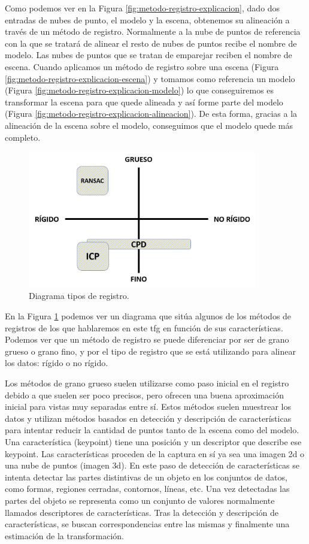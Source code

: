 Como podemos ver en la Figura \ref{fig:metodo-registro-explicacion}, dado dos entradas de nubes de punto, el modelo y la escena, obtenemos su alineación a través de un método de registro.
Normalmente a la nube de puntos de referencia con la que se tratará de alinear el resto de nubes de puntos recibe el nombre de modelo.
Las nubes de puntos que se tratan de emparejar reciben el nombre de escena.
Cuando aplicamos un método de registro sobre una escena (Figura \ref{fig:metodo-registro-explicacion-escena}) y tomamos como referencia un modelo (Figura \ref{fig:metodo-registro-explicacion-modelo}) lo que conseguiremos es transformar la escena para que quede alineada y así forme parte del modelo (Figura \ref{fig:metodo-registro-explicacion-alineacion}).
De esta forma, gracias a la alineación de la escena sobre el modelo, conseguimos que el modelo quede más completo.

\begin{figure}[h]
    \centering
    \includegraphics[height=6cm]{archivos/diagrama-tipos-registro.png}
    \caption{Diagrama tipos de registro.}
    \label{fig:diagrama-tipos-registro}
\end{figure}

En la Figura \ref{fig:diagrama-tipos-registro} podemos ver un diagrama que sitúa algunos de los métodos de registros de los que hablaremos en este \gls{tfg} en función de sus características.
Podemos ver que un método de registro se puede diferenciar por ser de grano grueso o grano fino, y por el tipo de registro que se está utilizando para alinear los datos: rígido o no rígido.
    
Los métodos de grano grueso suelen utilizarse como paso inicial en el registro debido a que suelen ser poco precisos, pero ofrecen una buena aproximación inicial para vistas muy separadas entre sí.
Estos métodos suelen muestrear los datos y utilizan métodos basados en detección y descripción de características para intentar reducir la cantidad de puntos tanto de la escena como del modelo.
Una característica (keypoint) tiene una posición y un descriptor que describe
ese keypoint.
Las características proceden de la captura en sí ya sea una imagen \gls{2d} o una nube de puntos (imagen \gls{3d}).
En este paso de detección de características se intenta detectar las partes distintivas de un objeto en los conjuntos de datos, como formas, regiones cerradas, contornos, líneas, etc.
Una vez detectadas las partes del objeto se representa como un conjunto de valores normalmente llamados descriptores de
características.
Tras la detección y descripción de características, se buscan correspondencias entre las mismas y finalmente una estimación de la transformación.


